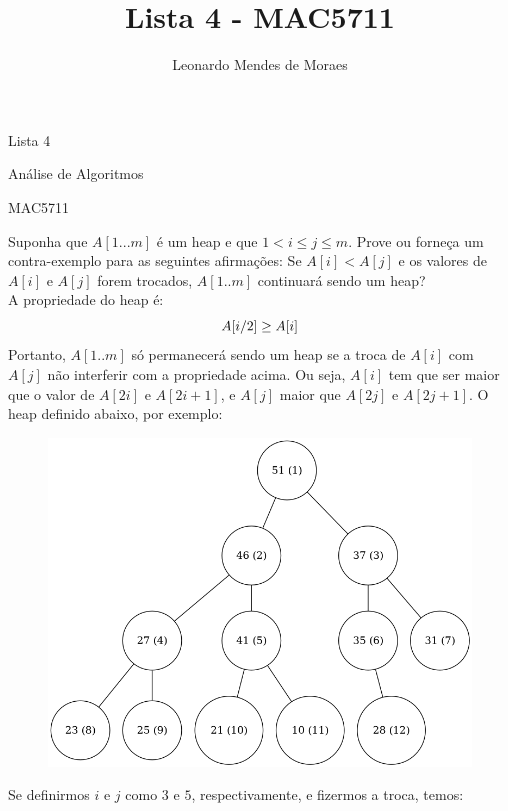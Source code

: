 \documentclass[12pt,a4paper]{article}
\author{Leonardo Mendes de Moraes }
\title{Lista 4 - MAC5711}
\date{}
\begin{document}
	\begin{center}
    {\huge Lista 4 \par} {\LARGE Análise de Algoritmos \par} {\Large MAC5711
    \par}
	\end{center}

 Suponha que $A[1...m]$ é um heap e que $1 < i \leq j \leq m$.
    Prove ou forneça um contra-exemplo para as seguintes afirmações:
     Se $A[i] < A[j]$ e os valores de $A[i]$ e $A[j]$ forem
    trocados, $A[1..m]$ continuará sendo um heap? \\
    A propriedade do heap é:
    \begin{equation}
            A[i/2] \geq A[i]
        \notag
    \end{equation}
    Portanto, $A[1..m]$ só permanecerá sendo um heap se a troca de $A[i]$ com
    $A[j]$ não interferir com a propriedade acima. Ou seja, $A[i]$ tem que ser
    maior que o valor de $A[2i]$ e $A[2i + 1]$, e $A[j]$ maior que $A[2j]$ e
    $A[2j +1]$. O heap definido abaixo, por exemplo:
    \begin{figure}[H]
        \centering

        \includegraphics[scale=0.4]{heap1.png}
    \end{figure}

    Se definirmos $i$ e $j$ como $3$ e $5$, respectivamente, e fizermos a troca, temos:
\end{document}
